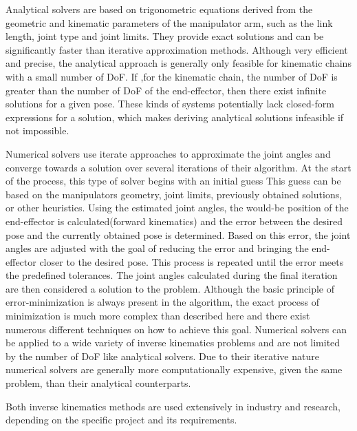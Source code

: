 Analytical solvers are based on trigonometric equations derived from the geometric and kinematic parameters of the manipulator arm, such as the link length, joint type and joint limits.
They provide exact solutions and can be significantly faster than iterative approximation methods.
Although very efficient and precise, the analytical approach is generally only feasible for kinematic chains with a small number of DoF.
If ,for the kinematic chain, the number of DoF is greater than the number of DoF of the end-effector, then there exist infinite solutions for a given pose.
These kinds of systems potentially lack closed-form expressions for a solution, which makes deriving analytical solutions infeasible if not impossible.


Numerical solvers use iterate approaches to approximate the joint angles and converge towards a solution over several iterations of their algorithm.
At the start of the process, this type of solver begins with an initial guess
This guess can be based on the manipulators geometry, joint limits, previously obtained solutions, or other heuristics.
Using the estimated joint angles, the would-be position of the end-effector is calculated(forward kinematics) and the error between the desired pose and the currently obtained pose is determined.
Based on this error, the joint angles are adjusted with the goal of reducing the error and bringing the end-effector closer to the desired pose.
This process is repeated until the error meets the predefined tolerances.
The joint angles calculated during the final iteration are then considered a solution to the problem.
Although the basic principle of error-minimization is always present in the algorithm, the exact process of minimization is much more complex than described here and there exist numerous different techniques on how to achieve this goal.
Numerical solvers can be applied to a wide variety of inverse kinematics problems and are not limited by the number of DoF like analytical solvers.
Due to their iterative nature numerical solvers are generally more computationally expensive, given the same problem, than their analytical counterparts.

Both inverse kinematics methods are used extensively in industry and research, depending on the specific project and its requirements.




